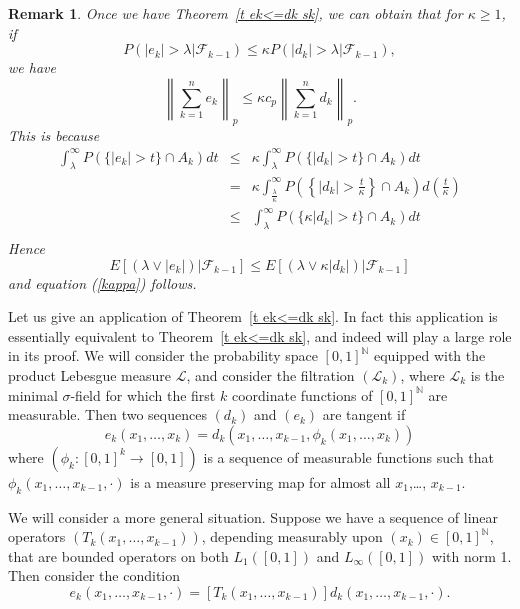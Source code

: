 \documentclass[12pt]{amsart}
\newtheorem{rem}{Remark}
\begin{document}
\begin{rem} {\upshape
Once we have Theorem~\ref{t ek<=dk sk}, we can obtain that for
$\kappa \geq 1$, if $$P(|e_k| > \lambda | \mathcal{F}_{k-1})\leq
\kappa P(|d_k| > \lambda | \mathcal{F}_{k-1}),$$ we have
\begin{equation}
\label{kappa} \left\|\sum_{k=1}^n e_k \right\|_p \leq  \kappa c_p
\left\| \sum_{k=1}^n d_k \right\|_p.
\end{equation}
This is because 
\begin{eqnarray*}
\int_\lambda^\infty P(\{|e_k|>t \} \cap A_k)dt
&\leq& \kappa \int_\lambda^\infty P(\{|d_k|>t \} \cap A_k)dt\\
&=& \kappa \int_{\frac{\lambda}{\kappa}}^\infty P\left( \left\{|d_k|> \frac{t}{\kappa } \right\} \cap A_k \right)d \left(\frac{t}{\kappa}\right)\\
&\leq& \int_\lambda^\infty P(\{\kappa |d_k|>t \} \cap A_k)dt\\
\end{eqnarray*}
Hence $$E[(\lambda \vee |e_k|)|\mathcal{F}_{k-1}]\leq E[(\lambda
\vee \kappa |d_k|)|\mathcal{F}_{k-1}]$$ and equation (\ref{kappa})
follows.
}\end{rem}

Let us give an application of Theorem~\ref{t ek<=dk sk}.
In fact this application is essentially equivalent to Theorem~\ref{t ek<=dk sk},
and indeed will play a large role in its proof.
We will consider the probability space $[0,1]^\mathbb{N}$ equipped
with the product Lebesgue measure $\mathcal L$, and consider the
filtration $(\mathcal{L}_k)$, where $\mathcal L_k$ is the minimal
$\sigma$-field for which the first $k$ coordinate functions of
$[0,1]^{\mathbb{N}}$ are measurable. Then two sequences $(d_k)$
and $(e_k)$ are tangent if
\[ e_k (x_1,\dots,x_k)=d_k(x_1,\dots,x_{k-1},\phi_k(x_1,\dots,x_k))\]
where $(\phi_k:[0,1]^k\rightarrow [0,1])$ is a sequence of
measurable functions such that $\phi_k(x_1,\dots,x_{k-1},\cdot)$
is a measure preserving map for almost all $x_1$,\dots, $x_{k-1}$.

We will consider a more general situation.  Suppose we have a
sequence of linear operators $(T_k(x_1,\dots,x_{k-1}))$, depending
measurably upon $(x_k) \in [0,1]^{\mathbb{N}}$, that are bounded
operators on both $L_1([0,1])$ and $L_\infty ([0,1])$ with norm 1.
Then consider the condition
\begin{equation}
\label{ek=Tk(dk)} e_k(x_1,\dots,x_{k-1}, \cdot
)=[T_k(x_1,\dots,x_{k-1})]d_k(x_1,\dots,x_{k-1}, \cdot ).
\end{equation}
\end{document}
